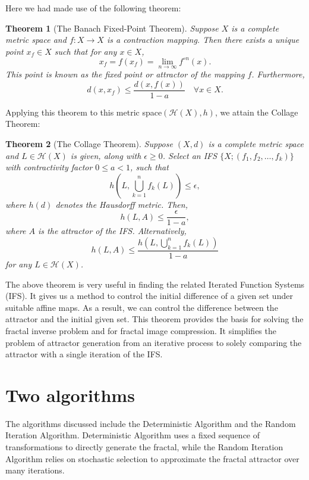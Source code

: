 \documentclass[a4paper,11pt, titlepage]{article}
\theoremstyle{definition}
\theoremstyle{plain}
\newtheorem{theorem}{Theorem}[section]
\theoremstyle{remark}
\theoremstyle{definition}
\begin{document}
Here we had made use of the following theorem:

\begin{theorem}[The Banach Fixed-Point Theorem]
Suppose \(X\) is a complete metric space and \(f : X \to X\) is a contraction mapping. Then there exists a unique point \(x_f \in X\) such that for any \(x \in X\),
$$
x_f = f(x_f) = \lim_{n \to \infty} f^{\circ n}(x).
$$
This point is known as the fixed point or attractor of the mapping \(f\). Furthermore,
$$
d(x, x_f) \leq \frac{d(x, f(x))}{1 - a} \quad \forall x \in X.
$$

\end{theorem}
Applying this theorem to this metric space$(\mathcal{H}(X), h)$, we attain the Collage Theorem:



\begin{theorem}[The Collage Theorem]
Suppose \((X, d)\) is a complete metric space and \(L \in \mathcal{H}(X)\) is given, along with \(\epsilon \geq 0\). Select an IFS \(\{X; (f_1, f_2, \ldots, f_k)\}\) with contractivity factor \(0 \leq a < 1\), such that
$$
h(L, \bigcup_{k=1}^n f_k(L)) \leq \epsilon,
$$
where \(h(d)\) denotes the Hausdorff metric. Then,
$$
h(L, A) \leq \frac{\epsilon}{1 - a},
$$
where \(A\) is the attractor of the IFS. Alternatively,
$$
h(L, A) \leq \frac{h(L, \bigcup_{k=1}^n f_k(L))}{1 - a}
$$
for any \(L \in \mathcal{H}(X)\).
\end{theorem}

The above theorem is very useful in finding the related Iterated Function Systems (IFS). It gives us a method to control the initial difference of a given set under suitable affine maps. As a result, we can control the difference between the attractor and the initial given set. This theorem provides the basis for solving the fractal inverse problem and for fractal image compression. It simplifies the problem of attractor generation from an iterative process to solely comparing the attractor with a single iteration of the IFS.



\section{Two algorithms}

The algorithms discussed include the Deterministic Algorithm and the Random Iteration Algorithm. Deterministic Algorithm uses a fixed sequence of transformations to directly generate the fractal, while the Random Iteration Algorithm relies on stochastic selection to approximate the fractal attractor over many iterations.
\end{document}
